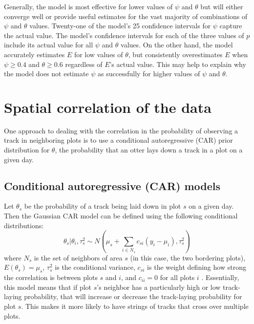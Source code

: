 \documentclass[12pt]{article}
\begin{document}
    Generally, the model is most effective for lower values of \(\psi\) and
    \(\theta\) but will either converge well or provide useful estimates for the
    vast majority of combinations of \(\psi\) and \(\theta\) values. Twenty-one
    of the
    model's 25 confidence intervals for \(\psi\) capture the actual value.
    The model's confidence intervals for each of the
    three values of \(p\) include its actual value for all \(\psi\) and
    \(\theta\) values. On the other hand, the model accurately estimates \(E\)
    for low values of \(\theta\), but consistently overestimates \(E\) when
    \(\psi\geq0.4\) and \(\theta\geq0.6\) regardless of \(E\)'s actual value.
    This may help to explain why the model does not estimate \(\psi\) as
    successfully for higher values of \(\psi\) and \(\theta\).

\section{Spatial correlation of the data}
One approach to dealing with the correlation in the probability of
observing a track in neighboring plots is to use a conditional autoregressive
(CAR) prior distribution for $\theta$, the probability that an otter lays down a
track in a plot on a given day.

    \subsection{Conditional autoregressive (CAR) models}
    Let $\theta_s$ be the probability of a track being laid down in plot $s$ on
    a given day. Then the Gaussian CAR model can be defined using the following
    conditional distributions:
    \begin{equation}
        \theta_s|\theta_i,\tau_s^2 \sim N(\mu_s+\sum_{i\in N_s}
        c_{si}(y_i-\mu_i),\tau_s^2)
    \end{equation}
    where $N_s$ is the set of neighbors of area $s$ (in this case, the two
    bordering plots), $E(\theta_s)=\mu_s$, $\tau_s^2$ is the conditional
    variance, $c_{si}$ is the weight defining how strong the correlation is
    between plots $s$ and $i$, and $c_{ii}=0$ for all plots $i$ \cite{Arab2008}.
    Essentially, this model means that if plot $s$'s neighbor has a
    particularly high or low track-laying probability, that will increase or
    decrease the track-laying probability for plot $s$. This makes it more
    likely to have strings of tracks that cross over multiple plots.
\end{document}
